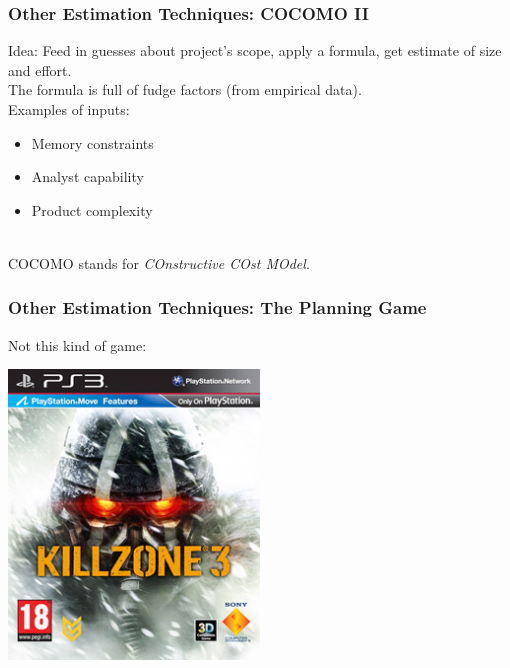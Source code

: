 \begin{frame}
\frametitle{Other Estimation Techniques: COCOMO II}

\begin{changemargin}{1cm}

Idea: Feed in guesses about project's scope, apply a formula, get
estimate of size and effort.\\[1em]

The formula is full of fudge factors (from empirical data).\\[1em]

Examples of inputs: 
\begin{itemize}
\item Memory constraints
\item Analyst capability
\item Product complexity
\end{itemize}

~\\

COCOMO stands for
\emph{COnstructive COst MOdel}.
\end{changemargin}

\end{frame}

\begin{frame}
\frametitle{Other Estimation Techniques: The Planning Game}

\begin{changemargin}{1cm}

Not this kind of game:

\begin{center}
\includegraphics[width=0.5\textwidth]{images/killzone3.jpg}
\end{center}
\end{changemargin}

\end{frame}

